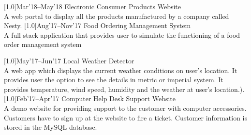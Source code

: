 \documentclass[english]{cv-style}     %
\begin{document}
\begin{entrylist}

\entry
  {\scalebox{.8}[1.0]{Mar'18--May'18}}
  {Electronic Consumer Products Website}
  {}
  {\\
 	A web portal to display all the products manufactured by a company called Nesty.
  }
\vspace{-0.3cm}
\entry
  {\scalebox{.8}[1.0]{Aug'17--Nov'17}}
  {Food Ordering Management System}
  {}
  {\\
  A full stack application that provides user to simulate  the functioning of a food order management system
  \newline
  }
\vspace{-0.3cm}

\entry
  {\scalebox{.8}[1.0]{May'17--Jun'17}}
  {Local Weather Detector}
  {}
  {\\
  A web app which displays the current weather conditions on user’s location. It provides user the
option to see the details in metric or imperial system. It provides temperature, wind speed, humidity and the
weather at user’s location.).\\}
\vspace{-0.3cm}
\entry
  {\scalebox{.8}[1.0]{Feb'17--Apr'17}}
  {Computer Help Desk Support Website}
  {}
  {\\
  A demo website for providing support to the customer with computer accessories. Customers
have to sign up at the website to fire a ticket. Customer information is stored in the MySQL database.
  \newline
  }
  
\end{entrylist}
\end{document}
